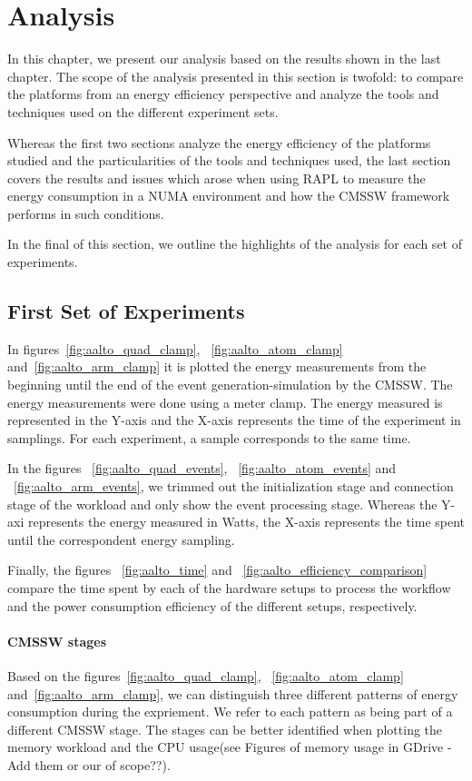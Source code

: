 \chapter{Analysis}



In this chapter, we present our analysis based on the results shown in the last chapter. The scope of the analysis presented in this section is twofold: to compare the
platforms from an energy efficiency perspective and analyze the tools and techniques used on the different experiment sets. 

Whereas the first two sections analyze the energy efficiency of the platforms
studied and the particularities of the tools and techniques used, the last 
section covers the results and issues which arose when using RAPL to measure 
the energy consumption in a NUMA environment and how the CMSSW framework performs in such conditions.

In the final of this section, we outline the highlights of the analysis for
each set of experiments.

\section{First Set of Experiments}

In figures~\ref{fig:aalto_quad_clamp}, ~\ref{fig:aalto_atom_clamp} 
and~\ref{fig:aalto_arm_clamp} it is plotted the energy measurements from the beginning until the end of the event generation-simulation by the CMSSW. The energy measurements were done using a meter clamp. The energy measured is represented in the Y-axis and the X-axis represents the time of the experiment in samplings. For each experiment, a sample corresponds to the same time.

In the figures ~\ref{fig:aalto_quad_events}, ~\ref{fig:aalto_atom_events} and ~\ref{fig:aalto_arm_events}, we trimmed out the initialization stage and connection stage of the workload and only show the event processing stage. Whereas the Y-axi represents the energy measured in Watts, the X-axis represents the time spent until the correspondent energy sampling.

Finally, the figures ~\ref{fig:aalto_time} and ~\ref{fig:aalto_efficiency_comparison} compare the time spent by each of the hardware setups to process the workflow and the power consumption efficiency of the different setups, respectively.

\subsubsection*{CMSSW stages}
Based on the figures~\ref{fig:aalto_quad_clamp}, ~\ref{fig:aalto_atom_clamp} 
and~\ref{fig:aalto_arm_clamp}, we can distinguish three different patterns of energy consumption during the expriement. 
We refer to each pattern as being part of a different CMSSW stage. The stages can be better identified 
when plotting the memory workload and the CPU usage(see Figures of memory usage in GDrive - Add them or our of scope??).

